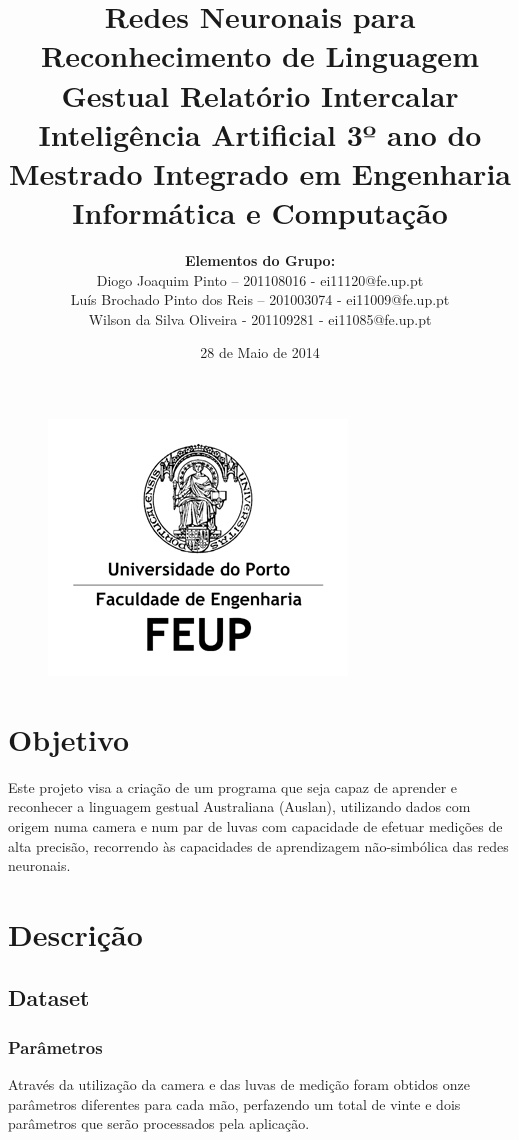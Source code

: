 \documentclass[10pt,a4paper]{article}
\title{\Huge\textbf{Redes Neuronais para Reconhecimento de Linguagem Gestual}\linebreak\linebreak\linebreak
\Large\textbf{Relatório Intercalar}\linebreak\linebreak
\Large{Inteligência Artificial}\linebreak
\Large{3º ano do Mestrado Integrado em Engenharia Informática e Computação} \linebreak \linebreak}
\author{\textbf{Elementos do Grupo:}\\ Diogo Joaquim Pinto – 201108016 - ei11120@fe.up.pt \\ Luís Brochado Pinto dos Reis – 201003074 - ei11009@fe.up.pt \\ Wilson da Silva Oliveira - 201109281 - ei11085@fe.up.pt}
\date{28 de Maio de 2014}
\begin{document}
\begin{figure}
\centering
\includegraphics[width=0.7\linewidth]{./LogoFeup}
\end{figure}

\maketitle

\tableofcontents

\newpage

\section{Objetivo}

Este projeto visa a criação de um programa que seja capaz de aprender e reconhecer a linguagem gestual Australiana  (Auslan), utilizando dados com origem numa camera e num par de luvas com capacidade de efetuar medições de alta precisão, recorrendo às capacidades de aprendizagem não-simbólica das redes neuronais.

\section{Descrição}

\subsection{Dataset}

\subsubsection{Parâmetros}

Através da utilização da camera e das luvas de medição foram obtidos onze parâmetros diferentes para cada mão, perfazendo um total de vinte e dois parâmetros que serão processados pela aplicação.
\end{document}
